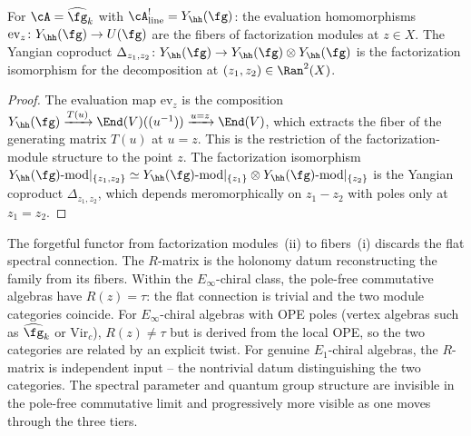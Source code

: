 \begin{proposition}
\label{prop:spectral-families}
For $\cA = \widehat{\fg}_k$ with
$\cA^!_{\mathrm{line}} = Y_\hh(\fg)$:
the evaluation homomorphisms
$\mathrm{ev}_z \colon Y_\hh(\fg) \to U(\fg)$ are the fibers
of factorization modules at $z \in X$. The Yangian coproduct
$\Delta_{z_1,z_2} \colon Y_\hh(\fg) \to
Y_\hh(\fg) \otimes Y_\hh(\fg)$
is the factorization isomorphism for the decomposition at
$(z_1, z_2) \in \Ran^2(X)$.
\end{proposition}

\begin{proof}
The evaluation map $\mathrm{ev}_z$ is the composition
$Y_\hh(\fg) \xrightarrow{T(u)} \End(V)((u^{-1}))
\xrightarrow{u=z} \End(V)$,
which extracts the fiber of the generating matrix $T(u)$ at
$u = z$. This is the restriction of the factorization-module
structure to the point $z$. The factorization isomorphism
$Y_\hh(\fg)\text{-mod} |_{\{z_1, z_2\}} \simeq
Y_\hh(\fg)\text{-mod} |_{\{z_1\}} \otimes
Y_\hh(\fg)\text{-mod} |_{\{z_2\}}$
is the Yangian coproduct $\Delta_{z_1,z_2}$, which depends
meromorphically on $z_1 - z_2$ with poles only at $z_1 = z_2$.
\end{proof}

\begin{remark}
\label{rem:two-categories-vs-one}
The forgetful functor from factorization modules~(ii) to fibers~(i)
discards the flat spectral connection. The $R$-matrix is the
holonomy datum reconstructing the family from its fibers. Within the
$E_\infty$-chiral class, the pole-free commutative algebras have
$R(z) = \tau$: the flat connection is trivial and the two module
categories coincide. For $E_\infty$-chiral algebras with OPE poles
(vertex algebras such as $\widehat{\fg}_k$ or $\mathrm{Vir}_c$),
$R(z) \neq \tau$ but is derived from the local OPE, so the two
categories are related by an explicit twist. For genuine
$E_1$-chiral algebras, the $R$-matrix is independent input -- the
nontrivial datum distinguishing the two categories. The spectral
parameter and quantum group structure are invisible in the pole-free
commutative limit and progressively more visible as one moves
through the three tiers.
\end{remark}

